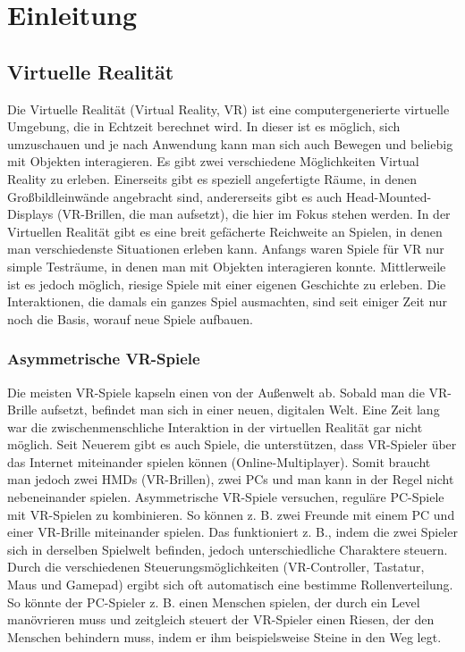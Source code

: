 \chapter{Einleitung}

\section{Virtuelle Realität}
Die Virtuelle Realität (Virtual Reality, VR) ist eine computergenerierte virtuelle Umgebung, die in Echtzeit berechnet wird. In dieser ist es möglich, sich umzuschauen und je nach Anwendung kann man sich auch Bewegen und beliebig mit Objekten interagieren. Es gibt zwei verschiedene Möglichkeiten Virtual Reality zu erleben. Einerseits gibt es speziell angefertigte Räume, in denen Großbildleinwände angebracht sind, andererseits gibt es auch Head-Mounted-Displays (VR-Brillen, die man aufsetzt), die hier im Fokus stehen werden. In der Virtuellen Realität gibt es eine breit gefächerte Reichweite an Spielen, in denen man verschiedenste Situationen erleben kann. Anfangs waren Spiele für VR nur simple Testräume, in denen man mit Objekten interagieren konnte. Mittlerweile ist es jedoch möglich, riesige Spiele mit einer eigenen Geschichte zu erleben. Die Interaktionen, die damals ein ganzes Spiel ausmachten, sind seit einiger Zeit nur noch die Basis, worauf neue Spiele aufbauen.

\subsection{Asymmetrische VR-Spiele}
Die meisten VR-Spiele kapseln einen von der Außenwelt ab. Sobald man die VR-Brille aufsetzt, befindet man sich in einer neuen, digitalen Welt. Eine Zeit lang war die zwischenmenschliche Interaktion in der virtuellen Realität gar nicht möglich. Seit Neuerem gibt es auch Spiele, die unterstützen, dass VR-Spieler über das Internet miteinander spielen können (Online-Multiplayer). Somit braucht man jedoch zwei HMDs (VR-Brillen), zwei PCs und man kann in der Regel nicht nebeneinander spielen. Asymmetrische VR-Spiele versuchen, reguläre PC-Spiele mit VR-Spielen zu kombinieren. So können z. B. zwei Freunde mit einem PC und einer VR-Brille miteinander spielen. Das funktioniert z. B., indem die zwei Spieler sich in derselben Spielwelt befinden, jedoch unterschiedliche Charaktere steuern. Durch die verschiedenen Steuerungsmöglichkeiten (VR-Controller, Tastatur, Maus und Gamepad) ergibt sich oft automatisch eine bestimme Rollenverteilung. So könnte der PC-Spieler z. B. einen Menschen spielen, der durch ein Level manövrieren muss und zeitgleich steuert der VR-Spieler einen Riesen, der den Menschen behindern muss, indem er ihm beispielsweise Steine in den Weg legt.

